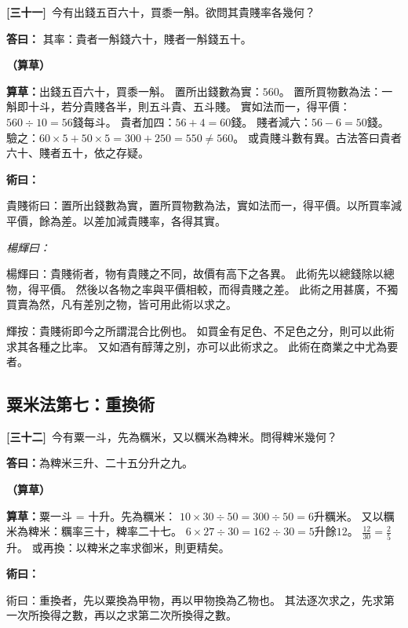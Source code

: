 \documentclass[11pt,a4paper]{article}
\newenvironment{method}{%
  \par\noindent\textcolor{methodcolor}{\textbf{術曰：}}%
  \ignorespaces
}{\par\vspace{0.5em}}
\newenvironment{caocao}{%
  \par\noindent\textcolor{caocaocolor}{\small\textbf{（算草）}}%
  \ignorespaces
}{\par\vspace{0.5em}}
\newenvironment{yanghuicomment}{%
  \par\noindent\textcolor{commentarycolor}{\small\textit{楊輝曰：}}%
  \ignorespaces
}{\par\vspace{0.5em}}
\newcommand{\problemnum}[1]{\textbf{[\ignorespaces#1\unskip]}}
\begin{document}
\noindent\problemnum{三十一}\,
今有出錢五百六十，買黍一斛。欲問其貴賤率各幾何？

\noindent\textcolor{answercolor}{\textbf{答曰：}}
其率：貴者一斛錢六十，賤者一斛錢五十。

\begin{caocao}
\textbf{算草：}出錢五百六十，買黍一斛。
置所出錢數為實：$560$。
置所買物數為法：一斛即十斗，若分貴賤各半，則五斗貴、五斗賤。
實如法而一，得平價：$560 \div 10 = 56$錢每斗。
貴者加四：$56 + 4 = 60$錢。
賤者減六：$56 - 6 = 50$錢。
驗之：$60 \times 5 + 50 \times 5 = 300 + 250 = 550 \neq 560$。
或貴賤斗數有異。古法答曰貴者六十、賤者五十，依之存疑。
\end{caocao}

\begin{method}
貴賤術曰：置所出錢數為實，置所買物數為法，實如法而一，得平價。以所買率減平價，餘為差。以差加減貴賤率，各得其實。
\end{method}

\begin{yanghuicomment}
楊輝曰：貴賤術者，物有貴賤之不同，故價有高下之各異。
此術先以總錢除以總物，得平價。
然後以各物之率與平價相較，而得貴賤之差。
此術之用甚廣，不獨買賣為然，凡有差別之物，皆可用此術以求之。

輝按：貴賤術即今之所謂混合比例也。
如買金有足色、不足色之分，則可以此術求其各種之比率。
又如酒有醇薄之別，亦可以此術求之。
此術在商業之中尤為要者。
\end{yanghuicomment}

\subsection{粟米法第七：重換術}

\noindent\problemnum{三十二}\,
今有粟一斗，先為糲米，又以糲米為粺米。問得粺米幾何？

\noindent\textcolor{answercolor}{\textbf{答曰：}}為粺米三升、二十五分升之九。

\begin{caocao}
\textbf{算草：}粟一斗 = 十升。先為糲米：
$10 \times 30 \div 50 = 300 \div 50 = 6$升糲米。
又以糲米為粺米：糲率三十，粺率二十七。
$6 \times 27 \div 30 = 162 \div 30 = 5$升餘$12$。
$\frac{12}{30} = \frac{2}{5}$升。
或再換：以粺米之率求御米，則更精矣。
\end{caocao}

\begin{method}
術曰：重換者，先以粟換為甲物，再以甲物換為乙物也。
其法逐次求之，先求第一次所換得之數，再以之求第二次所換得之數。
\end{method}
\end{document}
